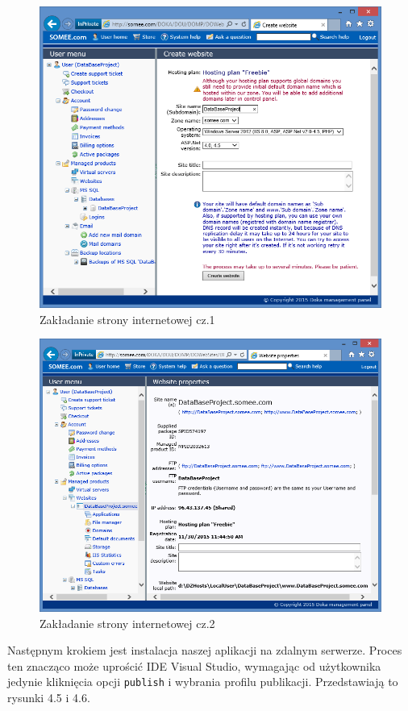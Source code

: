 \documentclass[a4paper,11pt]{article}
\begin{document}
\begin{figure}[h!]
	\centering
	\includegraphics[width=\textwidth,height=0.6\textheight]{somee1.png}
	\caption{Zakładanie strony internetowej cz.1}
\end{figure}
\begin{figure}[h!]
	\centering
	\includegraphics[width=\textwidth,height=0.6\textheight]{somee2.png}
	\caption{Zakładanie strony internetowej cz.2}
\end{figure}
Następnym krokiem jest instalacja naszej aplikacji na zdalnym serwerze. Proces ten znacząco może uprościć IDE Visual Studio, wymagając od użytkownika jedynie kliknięcia opcji \texttt{publish} i wybrania profilu publikacji. Przedstawiają to rysunki 4.5 i 4.6.
\end{document}
